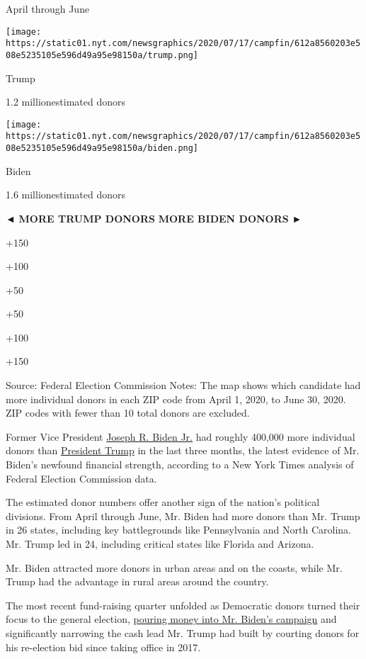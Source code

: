 April through June

\texttt{[image: https://static01.nyt.com/newsgraphics/2020/07/17/campfin/612a8560203e508e5235105e596d49a95e98150a/trump.png]}

Trump

1.2 millionestimated donors

\texttt{[image: https://static01.nyt.com/newsgraphics/2020/07/17/campfin/612a8560203e508e5235105e596d49a95e98150a/biden.png]}

Biden

1.6 millionestimated donors

\emph{◄} \textbf{MORE TRUMP DONORS} \textbf{MORE BIDEN DONORS} \emph{►}

+150

+100

+50

+50

+100

+150

Source: Federal Election Commission \textbar{} Notes: The map shows
which candidate had more individual donors in each ZIP code from April
1, 2020, to June 30, 2020. ZIP codes with fewer than 10 total donors are
excluded.

Former Vice President
\href{https://www.nytimes.com/interactive/2020/us/elections/joe-biden.html}{Joseph
R. Biden Jr.} had roughly 400,000 more individual donors than
\href{https://www.nytimes.com/interactive/2020/us/elections/donald-trump.html}{President
Trump} in the last three months, the latest evidence of Mr. Biden's
newfound financial strength, according to a New York Times analysis of
Federal Election Commission data.

The estimated donor numbers offer another sign of the nation's political
divisions. From April through June, Mr. Biden had more donors than Mr.
Trump in 26 states, including key battlegrounds like Pennsylvania and
North Carolina. Mr. Trump led in 24, including critical states like
Florida and Arizona.

Mr. Biden attracted more donors in urban areas and on the coasts, while
Mr. Trump had the advantage in rural areas around the country.

The most recent fund-raising quarter unfolded as Democratic donors
turned their focus to the general election,
\href{https://www.nytimes.com/2020/07/02/us/politics/biden-trump-fundraising-2020.html}{pouring
money into Mr. Biden's campaign} and significantly narrowing the cash
lead Mr. Trump had built by courting donors for his re-election bid
since taking office in 2017.


